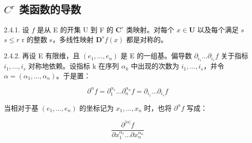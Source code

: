 \subsection{\texorpdfstring{\(C^{r}\) 类函数的导数}{C\^{}\{r\} 类函数的导数}}

2.4.1. 设 \(f\) 是从 E 的开集 U 到 F 的 \(\mathbf{C}^{r}\) 类映射。对每个 \(x \in \mathbf{U}\) 以及每个满足 \(s\)\(s \leqslant r\)  r 的整数 s，多线性映射 \(\mathbf{D}^{s}f(x)\) 都是对称的。

2.4.2. 再设 E 有限维，且 \((e_{1},\ldots,e_{n})\) 是 E 的一组基。偏导数 \(\partial_{i_{1}}\ldots\partial_{i_{s}}f\) 关于指标 \(i_{1},\ldots,i_{s}\) 对称地依赖。设指标 k 在序列 \(\alpha_{k}\) 中出现的次数为 \(i_{1},\ldots,i_{s}\)，并令 \(\alpha=(\alpha_{1},\ldots,\alpha_{n})\)。于是置：

\[
\partial^ {\alpha} f = \partial_ {1} ^ {\alpha_ {1}} \dots \partial_ {n} ^ {\alpha_ {n}} f = \partial_ {i _ {1}} \dots \partial_ {i _ {s}} f
\]

当相对于基 \((e_{1},\ldots,e_{n})\) 的坐标记为 \(x_{1},\ldots,x_{n}\) 时，也将 \(\partial^{\alpha}f\) 写成：

\[
\frac {\partial^ {| \alpha |} f}{\partial x _ {1} ^ {\alpha_ {1}} \dots \partial x _ {n} ^ {\alpha_ {n}}}
\]

